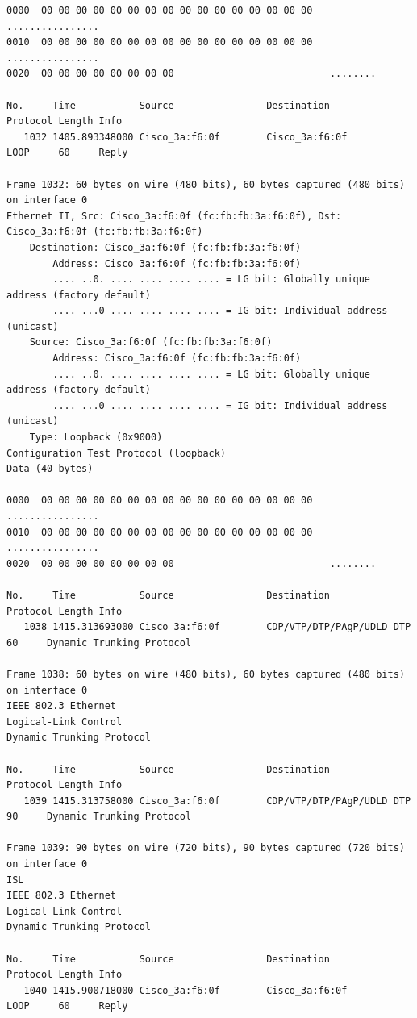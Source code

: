 \documentclass[a4paper,11pt]{article}
\begin{document}
\begin{lstlisting}
0000  00 00 00 00 00 00 00 00 00 00 00 00 00 00 00 00   ................
0010  00 00 00 00 00 00 00 00 00 00 00 00 00 00 00 00   ................
0020  00 00 00 00 00 00 00 00                           ........

No.     Time           Source                Destination           Protocol Length Info
   1032 1405.893348000 Cisco_3a:f6:0f        Cisco_3a:f6:0f        LOOP     60     Reply

Frame 1032: 60 bytes on wire (480 bits), 60 bytes captured (480 bits) on interface 0
Ethernet II, Src: Cisco_3a:f6:0f (fc:fb:fb:3a:f6:0f), Dst: Cisco_3a:f6:0f (fc:fb:fb:3a:f6:0f)
    Destination: Cisco_3a:f6:0f (fc:fb:fb:3a:f6:0f)
        Address: Cisco_3a:f6:0f (fc:fb:fb:3a:f6:0f)
        .... ..0. .... .... .... .... = LG bit: Globally unique address (factory default)
        .... ...0 .... .... .... .... = IG bit: Individual address (unicast)
    Source: Cisco_3a:f6:0f (fc:fb:fb:3a:f6:0f)
        Address: Cisco_3a:f6:0f (fc:fb:fb:3a:f6:0f)
        .... ..0. .... .... .... .... = LG bit: Globally unique address (factory default)
        .... ...0 .... .... .... .... = IG bit: Individual address (unicast)
    Type: Loopback (0x9000)
Configuration Test Protocol (loopback)
Data (40 bytes)

0000  00 00 00 00 00 00 00 00 00 00 00 00 00 00 00 00   ................
0010  00 00 00 00 00 00 00 00 00 00 00 00 00 00 00 00   ................
0020  00 00 00 00 00 00 00 00                           ........

No.     Time           Source                Destination           Protocol Length Info
   1038 1415.313693000 Cisco_3a:f6:0f        CDP/VTP/DTP/PAgP/UDLD DTP      60     Dynamic Trunking Protocol

Frame 1038: 60 bytes on wire (480 bits), 60 bytes captured (480 bits) on interface 0
IEEE 802.3 Ethernet 
Logical-Link Control
Dynamic Trunking Protocol

No.     Time           Source                Destination           Protocol Length Info
   1039 1415.313758000 Cisco_3a:f6:0f        CDP/VTP/DTP/PAgP/UDLD DTP      90     Dynamic Trunking Protocol

Frame 1039: 90 bytes on wire (720 bits), 90 bytes captured (720 bits) on interface 0
ISL
IEEE 802.3 Ethernet 
Logical-Link Control
Dynamic Trunking Protocol

No.     Time           Source                Destination           Protocol Length Info
   1040 1415.900718000 Cisco_3a:f6:0f        Cisco_3a:f6:0f        LOOP     60     Reply


\end{lstlisting}
\end{document}
